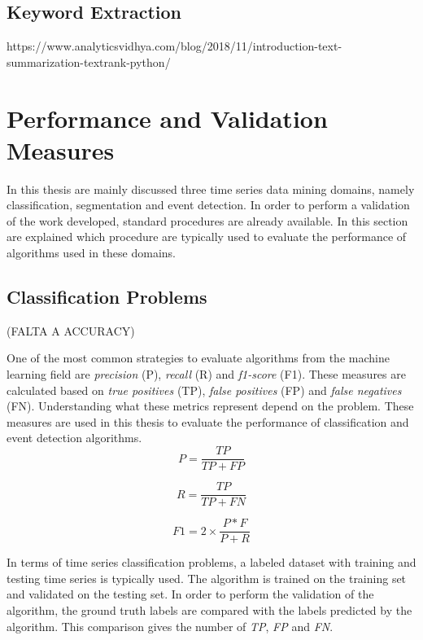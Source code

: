 \subsection{Keyword Extraction}

https://www.analyticsvidhya.com/blog/2018/11/introduction-text-summarization-textrank-python/


\section{Performance and Validation Measures}

In this thesis are mainly discussed three time series data mining domains, namely classification, segmentation and event detection. In order to perform a validation of the work developed, standard procedures are already available. In this section are explained which procedure are typically used to evaluate the performance of algorithms used in these domains.

\subsection{Classification Problems}

(FALTA A ACCURACY)

One of the most common strategies to evaluate algorithms from the machine learning field are \textit{precision} (P), \textit{recall} (R) and \textit{f1-score} (F1). These measures are calculated based on \textit{true positives} (TP), \textit{false positives} (FP) and \textit{false negatives} (FN). Understanding what these metrics represent depend on the problem. These measures are used in this thesis to evaluate the performance of classification and event detection algorithms.
\begin{equation}
\label{eq:precision}
P = \frac{TP}{TP+FP}
\end{equation}

\begin{equation}
\label{eq:recall}
R = \frac{TP}{TP+FN}
\end{equation}

\begin{equation}
\label{eq:f1_score}
F1 = 2 \times \frac{P*F}{P+R}
\end{equation}

In terms of time series classification problems, a labeled dataset with training and testing time series is typically used. The algorithm is trained on the training set and validated on the testing set. In order to perform the validation of the algorithm, the ground truth labels are compared with the labels predicted by the algorithm. This comparison gives the number of \textit{TP}, \textit{FP} and \textit{FN}. 

